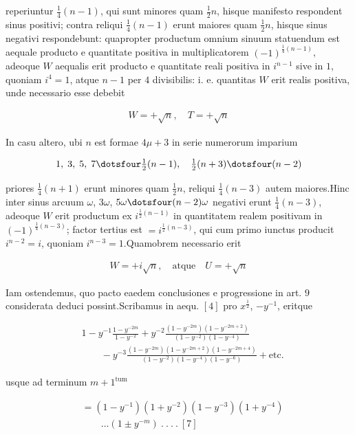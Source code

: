 reperiuntur $\frac14(n-1)$, qui sunt minores quam $\frac12n$, hisque manifesto respondent sinus positivi; contra reliqui $\frac14(n-1)$ erunt maiores quam $\frac12n$, hisque sinus negativi respondebunt: quapropter productum omnium sinuum statuendum est aequale producto e quantitate positiva in multiplicatorem $(-1)^{\frac14(n-1)}$, adeoque $W$ aequalis erit producto e quantitate reali positiva in $i^{n-1}$ sive in $1$, quoniam $i^4=1$, atque $n-1$ per $4$ divisibilis: i. e. quantitas $W$ erit realis positiva, unde necessario esse debebit

\[
\begin{aligned}
W=+\surd n,\quad T=+\surd n
\end{aligned}
\]

In casu altero, ubi $n$ est formae $4\mu+3$ in serie numerorum imparium

\[
\begin{aligned}
1,\;3,\;5,\;7\dotsfour\tfrac12(n-1),\quad\tfrac12(n+3)\dotsfour(n-2)
\end{aligned}
\]

priores $\frac14(n+1)$ erunt minores quam $\frac12n$, reliqui $\frac14(n-3)$ autem maiores.\quad Hinc inter sinus arcuum $\omega$, $3\omega$, $5\omega\dotsfour(n-2)\omega$ negativi erunt $\frac14(n-3)$, adeoque $W$ erit productum ex $i^{\frac12(n-1)}$ in quantitatem realem positivam in $(-1)^{\frac14(n-3)}$; factor tertius est $=i^{\frac12(n-3)}$, qui cum primo iunctus producit $i^{n-2}=i$, quoniam $i^{n-3}=1$.\quad Quamobrem necessario erit

\[
\begin{aligned}
W=+i\surd n,\quad\text{atque}\quad U=+\surd n
\end{aligned}
\]


Iam ostendemus, quo pacto eaedem conclusiones e progressione in art. $9$ considerata deduci possint.\quad Scribamus in aequ. $[4]$ pro $x^{\frac12}$, $-y^{-1}$, eritque


\[
\begin{aligned}
&1-y^{-1}\frac{1-y^{-2m}}{1-y^{-2}}+y^{-2}\frac{(1-y^{-2m})(1-y^{-2m+2})}{(1-y^{-2})(1-y^{-4})}\\&\qquad-y^{-3}\frac{(1-y^{-2m})(1-y^{-2m+2})(1-y^{-2m+4})}{(1-y^{-2})(1-y^{-4})(1-y^{-6})}+\text{etc.}
\end{aligned}
\]

usque ad terminum $m+1^{\mathrm{tum}}$

\[
\begin{aligned}
&=(1-y^{-1})(1+y^{-2})(1-y^{-3})(1+y^{-4})\\&\qquad\ldots(1\pm y^{-m})\  .\  .\  .\  .\ [7]
\end{aligned}
\]

